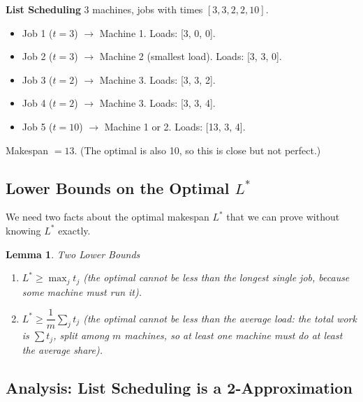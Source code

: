 \documentclass[12pt,a4paper]{report}
\newtheorem{lemma}{Lemma}
\begin{document}
\textbf{List Scheduling}{}
3 machines, jobs with times $[3, 3, 2, 2, 10]$.\\
\begin{itemize}
    \item Job 1 ($t=3$) $\to$ Machine 1. Loads: [3, 0, 0].
    \item Job 2 ($t=3$) $\to$ Machine 2 (smallest load). Loads: [3, 3, 0].
    \item Job 3 ($t=2$) $\to$ Machine 3. Loads: [3, 3, 2].
    \item Job 4 ($t=2$) $\to$ Machine 3. Loads: [3, 3, 4].
    \item Job 5 ($t=10$) $\to$ Machine 1 or 2. Loads: [13, 3, 4].
\end{itemize}
Makespan $= 13$. (The optimal is also 10, so this is close but not perfect.)


\subsection{Lower Bounds on the Optimal $L^*$}

We need two facts about the optimal makespan $L^*$ that we can prove without knowing $L^*$ exactly.

\begin{lemma}{Two Lower Bounds}{}
\begin{enumerate}
    \item $L^* \geq \max_j t_j$ \quad (the optimal cannot be less than the longest single job, because some machine must run it).
    \item $L^* \geq \dfrac{1}{m} \sum_j t_j$ \quad (the optimal cannot be less than the average load: the total work is $\sum t_j$, split among $m$ machines, so at least one machine must do at least the average share).
\end{enumerate}
\end{lemma}

\subsection{Analysis: List Scheduling is a 2-Approximation}
\end{document}
